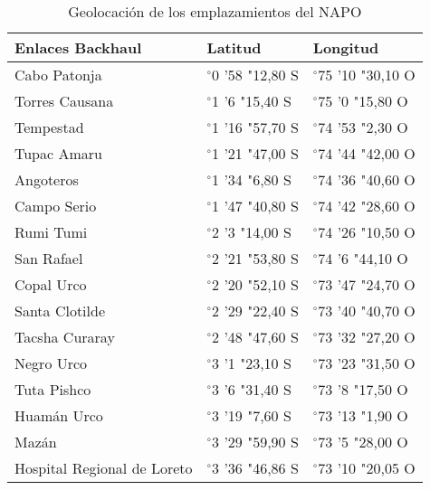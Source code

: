 \begin{table}[H]
	\begin{center}
		\begin{tabular}{|l|l|l|}
			\hline
			Enlaces Backhaul & Latitud & Longitud\\
			\hline 
			Cabo Patonja & $^{\circ}$0 '58 "12,80 S & $^{\circ}$75 '10 "30,10 O  \\ \hline
			Torres Causana & $^{\circ}$1 '6 "15,40 S & $^{\circ}$75 '0 "15,80 O \\ \hline
			Tempestad & $^{\circ}$1 '16 "57,70 S & $^{\circ}$74 '53 "2,30 O \\ \hline
			Tupac Amaru & $^{\circ}$1 '21 "47,00 S & $^{\circ}$74 '44 "42,00 O \\ \hline
			Angoteros & $^{\circ}$1 '34 "6,80 S & $^{\circ}$74 '36 "40,60 O \\ \hline
			Campo Serio & $^{\circ}$1 '47 "40,80 S & $^{\circ}$74 '42 "28,60 O \\ \hline
			Rumi Tumi & $^{\circ}$2 '3 "14,00 S & $^{\circ}$74 '26 "10,50 O \\ \hline
			San Rafael & $^{\circ}$2 '21 "53,80 S & $^{\circ}$74 '6 "44,10 O \\ \hline
			Copal Urco & $^{\circ}$2 '20 "52,10 S & $^{\circ}$73 '47 "24,70 O \\ \hline
			Santa Clotilde & $^{\circ}$2 '29 "22,40 S & $^{\circ}$73 '40 "40,70 O \\ \hline
			Tacsha Curaray & $^{\circ}$2 '48 "47,60 S & $^{\circ}$73 '32 "27,20 O \\ \hline
			Negro Urco & $^{\circ}$3 '1 "23,10 S & $^{\circ}$73 '23 "31,50 O \\ \hline
			Tuta Pishco & $^{\circ}$3 '6 "31,40 S & $^{\circ}$73 '8 "17,50 O \\ \hline
			Huamán Urco & $^{\circ}$3 '19 "7,60 S & $^{\circ}$73 '13 "1,90 O \\ \hline
			Mazán & $^{\circ}$3 '29 "59,90 S & $^{\circ}$73 '5 "28,00 O \\ \hline
			Hospital Regional de Loreto & $^{\circ}$3 '36 "46,86 S & $^{\circ}$73 '10 "20,05 O \\ \hline
		\end{tabular}
	\end{center}
	\caption{Geolocación de los emplazamientos del NAPO}
	\label{table:geolocalizacion}
\end{table}

